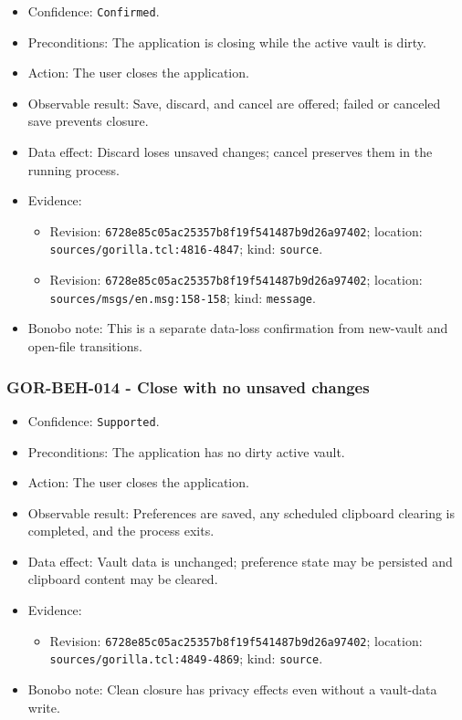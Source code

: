 \documentclass[
  letterpaper,
]{article}
\newcommand{\passthrough}[1]{#1}
\providecommand{\tightlist}{%
  \setlength{\itemsep}{0pt}\setlength{\parskip}{0pt}}
\begin{document}
\begin{itemize}
\tightlist
\item
  Confidence: \passthrough{\lstinline!Confirmed!}.
\item
  Preconditions: The application is closing while the active vault is dirty.
\item
  Action: The user closes the application.
\item
  Observable result: Save, discard, and cancel are offered; failed or canceled save prevents closure.
\item
  Data effect: Discard loses unsaved changes; cancel preserves them in the running process.
\item
  Evidence:

  \begin{itemize}
  \tightlist
  \item
    Revision: \nolinkurl{6728e85c05ac25357b8f19f541487b9d26a97402}; location: \nolinkurl{sources/gorilla.tcl:4816-4847};
    kind: \passthrough{\lstinline!source!}.
  \item
    Revision: \nolinkurl{6728e85c05ac25357b8f19f541487b9d26a97402}; location: \nolinkurl{sources/msgs/en.msg:158-158};
    kind: \passthrough{\lstinline!message!}.
  \end{itemize}
\item
  Bonobo note: This is a separate data-loss confirmation from new-vault and open-file transitions.
\end{itemize}

\subsubsection{GOR-BEH-014 - Close with no unsaved changes}\label{gor-beh-014---close-with-no-unsaved-changes}

\begin{itemize}
\tightlist
\item
  Confidence: \passthrough{\lstinline!Supported!}.
\item
  Preconditions: The application has no dirty active vault.
\item
  Action: The user closes the application.
\item
  Observable result: Preferences are saved, any scheduled clipboard clearing is completed, and the process exits.
\item
  Data effect: Vault data is unchanged; preference state may be persisted and clipboard content may be cleared.
\item
  Evidence:

  \begin{itemize}
  \tightlist
  \item
    Revision: \nolinkurl{6728e85c05ac25357b8f19f541487b9d26a97402}; location: \nolinkurl{sources/gorilla.tcl:4849-4869};
    kind: \passthrough{\lstinline!source!}.
  \end{itemize}
\item
  Bonobo note: Clean closure has privacy effects even without a vault-data write.
\end{itemize}
\end{document}
